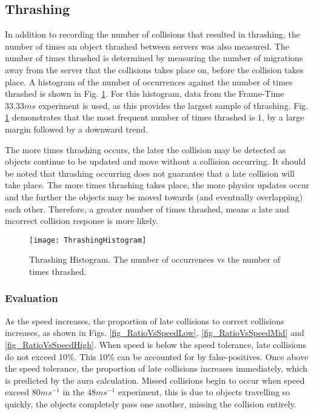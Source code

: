 \subsection{Thrashing}
In addition to recording the number of collisions that resulted in thrashing, the number of times an object thrashed between servers was also measured. The number of times thrashed is determined by measuring the number of migrations away from the server that the collisions takes place on, before the collision takes place. A histogram of the number of occurrences against the number of times thrashed is shown in Fig. \ref{fig_ThrashingHistogram}. For this histogram, data from the Frame-Time $33.33ms$ experiment is used, as this provides the largest sample of thrashing. Fig. \ref{fig_ThrashingHistogram} demonstrates that the most frequent number of times thrashed is 1, by a large margin followed by a downward trend.

The more times thrashing occurs, the later the collision may be detected as objects continue to be updated and move without a collision occurring. It should be noted that thrashing occurring does not guarantee that a late collision will take place. The more times thrashing takes place, the more physics updates occur and the further the objects may be moved towards (and eventually overlapping) each other. Therefore, a greater number of times thrashed, means a late and incorrect collision response is more likely.

\begin{figure}[t]
	\centering
	\texttt{[image: ThrashingHistogram]}
	\caption{Thrashing Histogram. The number of occurrences vs the number of times thrashed.}
	\label{fig_ThrashingHistogram}
\end{figure}


\subsubsection{Evaluation}
As the speed increases, the proportion of late collisions to correct collisions increases, as shown in Figs. \ref{fig_RatioVsSpeedLow}, \ref{fig_RatioVsSpeedMid} and \ref{fig_RatioVsSpeedHigh}. When speed is below the speed tolerance, late collisions do not exceed 10\%. This 10\% can be accounted for by false-positives. Once above the speed tolerance, the proportion of late collisions increases immediately, which is predicted by the aura calculation. Missed collisions begin to occur when speed exceed $80ms^{-1}$ in the $48ms^{-1}$ experiment, this is due to objects travelling so quickly, the objects completely pass one another, missing the collision entirely.

